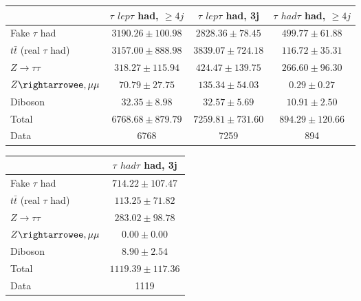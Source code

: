 \begin{table}
\begin{center}
  \begin{tabular}{ | l |  c |  c |  c | }
    \hline \hline 
     &  $\tau$ ${lep}\tau$ {had}, $\geq4j$  &  $\tau$ ${lep}\tau$ {had}, 3j  &  $\tau$ ${had}\tau$ {had}, $\geq4j$  \\ 
    \hline 
     Fake $\tau$ {had}  &   $ 3190.26 \pm 100.98 $ &   $ 2828.36 \pm 78.45 $ &   $ 499.77 \pm 61.88 $ \\ 
     $t\bar{t}$ (real $\tau$ {had})  &   $ 3157.00 \pm 888.98 $ &   $ 3839.07 \pm 724.18 $ &   $ 116.72 \pm 35.31 $ \\ 
     $Z\rightarrow\tau\tau$  &   $ 318.27 \pm 115.94 $ &   $ 424.47 \pm 139.75 $ &   $ 266.60 \pm 96.30 $ \\ 
     $Z\rightarrowee,\mu\mu$  &   $ 70.79 \pm 27.75 $ &   $ 135.34 \pm 54.03 $ &   $ 0.29 \pm 0.27 $ \\ 
    Diboson  &   $ 32.35 \pm 8.98 $ &   $ 32.57 \pm 5.69 $ &   $ 10.91 \pm 2.50 $ \\ 
    Total  &   $ 6768.68 \pm 879.79 $ &   $ 7259.81 \pm 731.60 $ &   $ 894.29 \pm 120.66 $ \\ 
    \hline 
    Data  & 6768  & 7259  & 894  \\ 
    \hline \hline 
  \end{tabular} 


  \begin{tabular}{ | l |  c | }
    \hline \hline 
     &  $\tau$ ${had}\tau$ {had}, 3j  \\ 
    \hline 
     Fake $\tau$ {had}  &   $ 714.22 \pm 107.47 $ \\ 
     $t\bar{t}$ (real $\tau$ {had})  &   $ 113.25 \pm 71.82 $ \\ 
     $Z\rightarrow\tau\tau$  &   $ 283.02 \pm 98.78 $ \\ 
     $Z\rightarrowee,\mu\mu$  &   $ 0.00 \pm 0.00 $ \\ 
    Diboson  &   $ 8.90 \pm 2.54 $ \\ 
    Total  &   $ 1119.39 \pm 117.36 $ \\ 
    \hline 
    Data  & 1119  \\ 
    \hline \hline 
  \end{tabular} 


\end{center}
\end{table}
